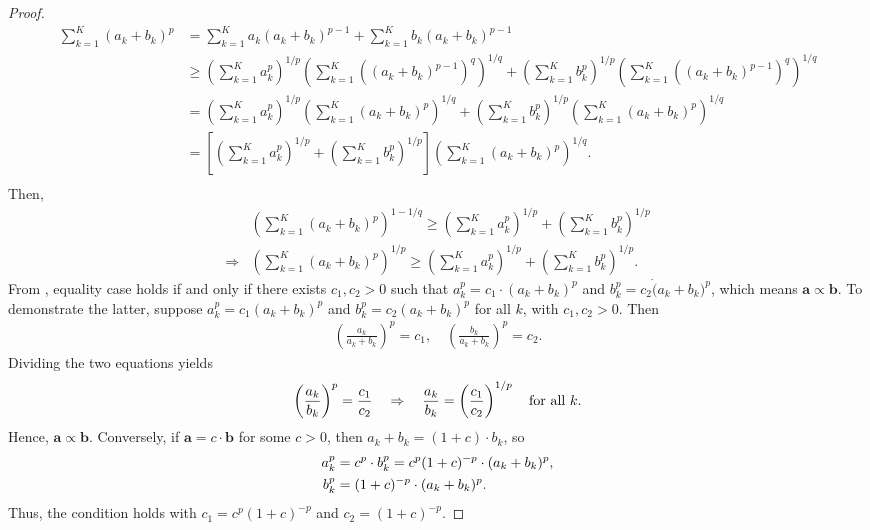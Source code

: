 \documentclass[10pt]{article} %
\def\rva{{\mathbf{a}}}
\def\rvb{{\mathbf{b}}}
\begin{document}
\begin{proof}
\begin{align}
\sum_{k=1}^{K} (a_k + b_k)^p 
&= \sum_{k=1}^{K} a_k (a_k + b_k)^{p-1} + \sum_{k=1}^{K} b_k (a_k + b_k)^{p-1} \\
&\geq \left( \sum_{k=1}^{K} a_k^p \right)^{1/p} \left( \sum_{k=1}^{K} \left((a_k + b_k)^{p-1}\right)^q \right)^{1/q} 
+ \left( \sum_{k=1}^{K} b_k^p \right)^{1/p} \left( \sum_{k=1}^{K} \left((a_k + b_k)^{p-1}\right)^q \right)^{1/q} \\
&= \left( \sum_{k=1}^{K} a_k^p \right)^{1/p} \left( \sum_{k=1}^{K} (a_k + b_k)^p \right)^{1/q}
+ \left( \sum_{k=1}^{K} b_k^p \right)^{1/p} \left( \sum_{k=1}^{K} (a_k + b_k)^p \right)^{1/q} \\
&= \left[ \left( \sum_{k=1}^{K} a_k^p \right)^{1/p} + \left( \sum_{k=1}^{K} b_k^p \right)^{1/p} \right]
\left( \sum_{k=1}^{K} (a_k + b_k)^p \right)^{1/q}. \\
\end{align}
Then,
\begin{align}
&\left( \sum_{k=1}^{K} (a_k + b_k)^p \right)^{1 - 1/q}
\geq \left( \sum_{k=1}^{K} a_k^p \right)^{1/p} + \left( \sum_{k=1}^{K} b_k^p \right)^{1/p} \\
 \Rightarrow &\left( \sum_{k=1}^{K} (a_k + b_k)^p \right)^{1/p}
\geq \left( \sum_{k=1}^{K} a_k^p \right)^{1/p} + \left( \sum_{k=1}^{K} b_k^p \right)^{1/p}.
\end{align}
From , equality case holds if and only if there exists $c_1,c_2 > 0$ such that $a_k^p = c_1 \cdot (a_k + b_k)^p$ and $b_k^p = c_2 \dot (a_k+b_k)^p $, which means $\rva \propto \rvb$. To demonstrate the latter, suppose $a_k^p = c_1 (a_k + b_k)^p$ and $b_k^p = c_2 (a_k + b_k)^p$ for all $k$, with $c_1, c_2 > 0$. Then
\begin{align}
\left( \frac{a_k}{a_k + b_k} \right)^p = c_1,  \quad
\left( \frac{b_k}{a_k + b_k} \right)^p = c_2. 
\end{align}
Dividing the two equations yields
\begin{align}
\left( \frac{a_k}{b_k} \right)^p = \frac{c_1}{c_2}
\quad \Rightarrow \quad
\frac{a_k}{b_k} = \left( \frac{c_1}{c_2} \right)^{1/p}
\quad \text{for all } k. \notag
\end{align}
Hence, $\mathbf{a} \propto \mathbf{b}$. Conversely, if $\mathbf{a} = c \cdot \mathbf{b}$ for some $c > 0$, then $a_k + b_k = (1 + c) \cdot b_k$, so
\begin{align}
a_k^p &= c^p \cdot b_k^p = c^p (1 + c)^{-p} \cdot (a_k + b_k)^p, \notag \\
b_k^p &= (1 + c)^{-p} \cdot (a_k + b_k)^p. \notag
\end{align}
Thus, the condition holds with $c_1 = c^p  (1 + c)^{-p}$ and $c_2 = (1 + c)^{-p}$.

\end{proof}
\end{document}
